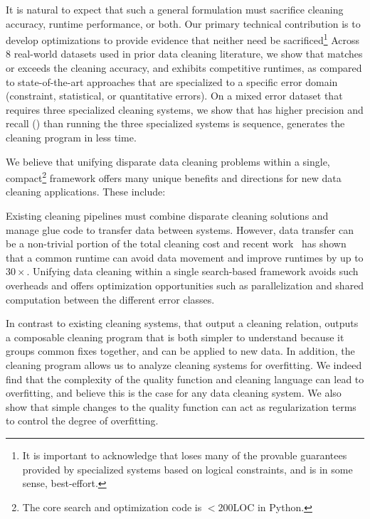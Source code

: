 It is natural to expect that such a general formulation must sacrifice cleaning accuracy, runtime performance, or both.  Our primary technical contribution is to develop optimizations to provide evidence that neither need be sacrificed\footnote{It is important to acknowledge that \sys loses many of the provable guarantees provided by specialized systems based on logical constraints, and is in some sense, best-effort.  }
Across 8 real-world datasets used in prior data cleaning literature, we show that \sys matches or exceeds the cleaning accuracy, and exhibits competitive runtimes, as compared to state-of-the-art approaches that are specialized to a specific error domain (constraint, statistical, or quantitative errors).  On a mixed error dataset that requires three specialized cleaning systems, we show that \sys has higher precision and recall () than running the three specialized systems is sequence, generates the cleaning program in  less time.

We believe that unifying disparate data cleaning problems within a single, compact\footnote{The core search and optimization code is $<200$LOC in Python.} framework offers many unique benefits and directions for new data cleaning applications.  These include:

 Existing cleaning pipelines must combine disparate cleaning solutions and manage glue code to transfer data between systems.  However, data transfer can be a non-trivial portion of the total cleaning cost and recent work~\cite{palkar2017weld} has shown that a common runtime can avoid data movement and improve runtimes by up to $30\times$.  Unifying data cleaning within a single search-based framework avoids such overheads and offers optimization opportunities such as parallelization and shared computation between the different error classes.

  In contrast to existing cleaning systems, that output a cleaning relation, \sys outputs a composable cleaning program that is both simpler to understand because it groups common fixes together, and can be applied to new data.  In addition, the cleaning program allows us to analyze cleaning systems for overfitting.  We indeed find that the complexity of the quality function and cleaning language can lead to overfitting, and believe this is the case for any data cleaning system.  We also show that simple changes to the quality function can act as regularization terms to control the degree of overfitting.

